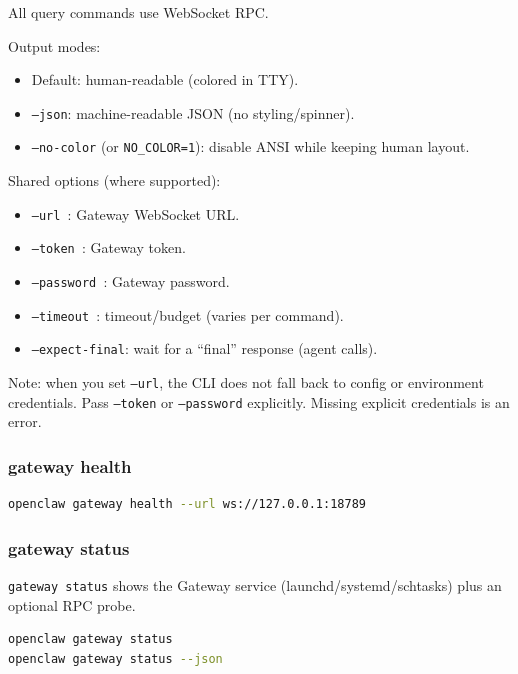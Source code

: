 All query commands use WebSocket RPC.

Output modes:

\begin{itemize}
  \item Default: human-readable (colored in TTY).
  \item \texttt{--json}: machine-readable JSON (no styling/spinner).
  \item \texttt{--no-color} (or \texttt{NO\_COLOR=1}): disable ANSI while keeping human layout.
\end{itemize}


Shared options (where supported):

\begin{itemize}
  \item \texttt{--url }: Gateway WebSocket URL.
  \item \texttt{--token }: Gateway token.
  \item \texttt{--password }: Gateway password.
  \item \texttt{--timeout }: timeout/budget (varies per command).
  \item \texttt{--expect-final}: wait for a “final” response (agent calls).
\end{itemize}


Note: when you set \texttt{--url}, the CLI does not fall back to config or environment credentials.
Pass \texttt{--token} or \texttt{--password} explicitly. Missing explicit credentials is an error.

\subsubsection{gateway health}


\begin{lstlisting}[language=bash]
openclaw gateway health --url ws://127.0.0.1:18789
\end{lstlisting}


\subsubsection{gateway status}


\texttt{gateway status} shows the Gateway service (launchd/systemd/schtasks) plus an optional RPC probe.

\begin{lstlisting}[language=bash]
openclaw gateway status
openclaw gateway status --json
\end{lstlisting}


